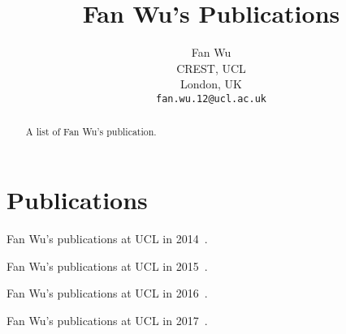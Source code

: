 \documentclass{article}
\begin{document}
\title{Fan Wu's Publications}

\author{
	Fan Wu \\
	CREST, UCL \\
	London, UK \\
	\texttt{fan.wu.12@ucl.ac.uk}
}

\maketitle
\begin{abstract}

A list of Fan Wu's publication.

\end{abstract}

\section{Publications}
Fan Wu's publications at UCL in 2014~\cite{pidgincrasher, harman2014genetic}.

Fan Wu's publications at UCL in 2015~\cite{7107449, Wu:2015:DPO:2739480.2754648, Jia:2015:GIU:2739482.2768417, sbselector}.

Fan Wu's publications at UCL in 2016~\cite{wu2016homi, Bowes:2016:MFP:2931037.2931039}.

Fan Wu's publications at UCL in 2017~\cite{Wu201797, 7582553, basios2017darwinian}.



\end{document}
